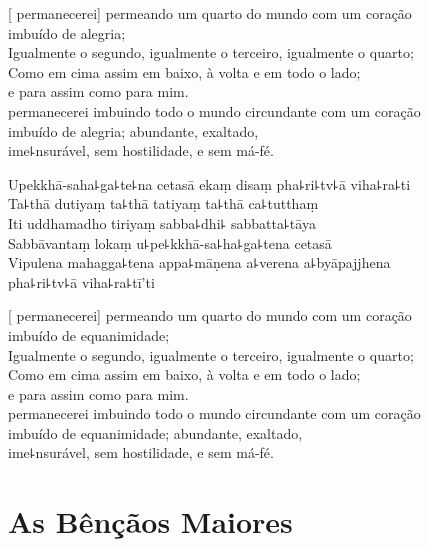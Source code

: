 [ permanecerei] permeando um quarto do mundo com um coração\\
\vin imbuído de alegria;\\
Igualmente o segundo, igualmente o terceiro, igualmente o quarto;\\
Como em cima assim em baixo, à volta e em todo o lado;\\
\vin e para  assim como para mim.\\
 permanecerei imbuindo todo o mundo circundante com um coração\\
\vin imbuído de alegria; abundante, exaltado,\\
\vin ime꜕nsurável, sem hostilidade, e sem má-fé.

\clearpage

Upekkhā-saha꜕ga꜕te꜕na cetasā ekaṃ disaṃ pha꜕ri꜕tv꜕ā viha꜕ra꜕ti\\
Ta꜕thā dutiyaṃ ta꜕thā tatiyaṃ ta꜕thā ca꜕tutthaṃ\\
Iti uddhamadho tiriyaṃ sabba꜕dhi꜕ sabbatta꜕tāya\\
Sabbāvantaṃ lokaṃ u꜕pe꜕kkhā-sa꜕ha꜕ga꜕tena cetasā\\
Vipulena mahagga꜕tena appa꜕māṇena a꜕verena a꜕byāpajjhena\\
\vin pha꜕ri꜕tv꜕ā viha꜕ra꜕tī'ti

\clearpage

[ permanecerei] permeando um quarto do mundo com um coração\\
\vin imbuído de equanimidade;\\
Igualmente o segundo, igualmente o terceiro, igualmente o quarto;\\
Como em cima assim em baixo, à volta e em todo o lado;\\
\vin e para  assim como para mim.\\
 permanecerei imbuindo todo o mundo circundante com um coração \\
\vin imbuído de equanimidade; abundante, exaltado,\\
\vin ime꜕nsurável, sem hostilidade, e sem má-fé.

\chapter{As Bênçãos Maiores}


\begin{leader}
\end{leader}


